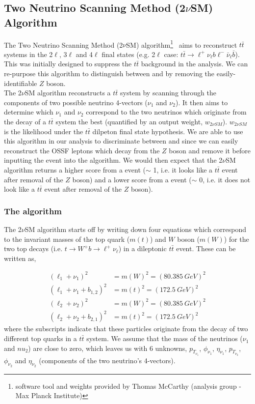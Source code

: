 \subsection{Two Neutrino Scanning Method (2$\nu$SM) Algorithm}
\label{sec:2vsm}
The Two Neutrino Scanning Method (2$\nu$SM) algorithm\footnote{software tool and weights provided by Thomas McCarthy (\ttZ analysis group - Max Planck Institute)}~\cite{2vSM-ref1,2vSM-ref2} aims to reconstruct $t\bar{t}$ systems in the 2$\ell$, 3$\ell$ and 4$\ell$ final states (e.g. 2$\ell$ case: $t\bar{t}\rightarrow \ell^{+}\nu_{\ell}b\ell^{-}\bar{\nu}_{\ell}\bar{b}$). This was initially designed to suppress the $t\bar{t}$ background in the \ttZ analysis. We can re-purpose this algorithm to distinguish between \tWZ and \ttZ by removing the easily-identifiable $Z$ boson.\\

The 2$\nu$SM algorithm reconstructs a $t\bar{t}$ system by scanning through the components of two possible neutrino 4-vectors ($\nu_{1}$ and $\nu_{2}$). It then aims to determine which $\nu_{1}$ and $\nu_{2}$ correspond to the two neutrinos which originate from the decay of a $t\bar{t}$ system the best (quantified by an output weight, $w_{2\nu SM}$). $w_{2\nu SM}$ is the likelihood under the $t\bar{t}$ dilpeton final state hypothesis. We are able to use this algorithm in our analysis to discriminate between \tWZ and \ttZ since we can easily reconstruct the OSSF leptons which decay from the $Z$ boson and remove it before inputting the event into the algorithm. We would then expect that the 2$\nu$SM algorithm returns a higher score from a \ttZ event ($\sim$ 1, i.e. it looks like a $t\bar{t}$ event after removal of the $Z$ boson) and a lower score from a \tWZ event ($\sim$ 0, i.e. it does not look like a $t\bar{t}$ event after removal of the $Z$ boson).
\subsubsection{The algorithm}
The 2$\nu$SM algorithm starts off by writing down four equations which correspond to the invariant masses of the top quark ($m(t)$) and $W$ boson ($m(W)$) for the two top decays (i.e. $t\rightarrow W^{+}b \rightarrow \ell^{+} \nu_{\ell}$) in a dileptonic $t\bar{t}$ event. These can be written as,

\begin{align}
    (\ell_{1} + \nu_{1})^{2} &= m(W)^{2} = (\SI{80.385}{GeV})^2\\
    (\ell_{1} + \nu_{1} + b_{1,2})^{2} &= m(t)^{2} = (\SI{172.5}{GeV})^{2}\\
    (\ell_{2} + \nu_{2})^{2} &= m(W)^{2} = (\SI{80.385}{GeV})^2\\
       (\ell_{2} + \nu_{2} + b_{2,1})^{2} &= m(t)^{2} = (\SI{172.5}{GeV})^{2}
\end{align}
where the subscripts indicate that these particles originate from the decay of two different top quarks in a $t\bar{t}$ system. We assume that the mass of the neutrinos ($\nu_{1}$ and $nu_{2}$) are close to zero, which leaves us with 6 unknowns, $p_{{T}_{\nu_{1}}}$, $\phi_{\nu_{1}}$, $\eta_{\nu_{1}}$, $p_{{T}_{\nu_{2}}}$, $\phi_{\nu_{2}}$ and $\eta_{\nu_{2}}$ (components of the two neutrino's 4-vectors).\\

